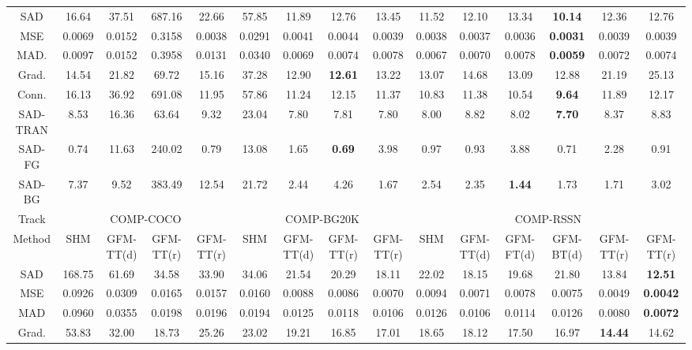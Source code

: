 \documentclass[twocolumn]{svjour3}
\begin{document}
\begin{table*}[htbp]
{\begin{tabular}{c|ccccc|ccc|ccc|ccc}
\hline
SAD & 16.64 & 37.51 & 687.16& 22.66 &57.85  &11.89&12.76&13.45 &11.52&12.10& 13.34&\textbf{10.14}&12.36&12.76\\
MSE & 0.0069 & 0.0152& 0.3158 & 0.0038 & 0.0291 &0.0041&0.0044&0.0039&0.0038&0.0037& 0.0036&\textbf{0.0031}&0.0039 & 0.0039\\
MAD. & 0.0097 & 0.0152 &0.3958 & 0.0131 &  0.0340&0.0069&0.0074 & 0.0078&0.0067&0.0070 &0.0078&\textbf{0.0059}&0.0072 & 0.0074\\
Grad. & 14.54 & 21.82 & 69.72 & 15.16 & 37.28&12.90&\textbf{12.61}&13.22 &13.07&14.68& 13.09&12.88&21.19 & 25.13\\
Conn. & 16.13 & 36.92 & 691.08 & 11.95 &  57.86&11.24&12.15&11.37 &10.83&11.38& 10.54&\textbf{9.64}&11.89 & 12.17\\
SAD-TRAN & 8.53 & 16.36 & 63.64 & 9.32 &23.04 &7.80&7.81&7.80 &8.00&8.82& 8.02&\textbf{7.70}&8.37 & 8.83\\
SAD-FG & 0.74 & 11.63  & 240.02 &0.79 & 13.08 &1.65&\textbf{0.69}&3.98&0.97&0.93& 3.88&0.71&2.28 & 0.91\\
SAD-BG & 7.37 & 9.52 & 383.49 &12.54 & 21.72 &2.44&4.26&1.67&2.54&2.35& \textbf{1.44}&1.73&1.71 & 3.02\\
\hline
Track & \multicolumn{4}{|c}{COMP-COCO} & \multicolumn{4}{|c}{COMP-BG20K} & \multicolumn{6}{|c}{COMP-RSSN}\\
\hline
Method & SHM & \multicolumn{1}{c}{GFM-TT(d)} & \multicolumn{1}{c}{GFM-TT(r)} & \multicolumn{1}{c|}{GFM-TT(r)} &\multicolumn{1}{c}{SHM} &\multicolumn{1}{c}{GFM-TT(d)} & GFM-TT(r)& \multicolumn{1}{c|}{GFM-TT(r)} &SHM & GFM-TT(d)&\multicolumn{1}{c}{GFM-FT(d)} & GFM-BT(d)& GFM-TT(r) & GFM-TT(r)\\
\hline
SAD & 168.75&61.69&34.58 & \multicolumn{1}{c|}{33.90}& \multicolumn{1}{c}{34.06}&\multicolumn{1}{c}{21.54}&20.29&\multicolumn{1}{c|}{18.11}&22.02&\multicolumn{1}{c}{18.15} &\multicolumn{1}{c}{19.68}&21.80 &13.84 & \textbf{12.51}\\
MSE &0.0926 &0.0309&0.0165 &\multicolumn{1}{c|}{0.0157}& \multicolumn{1}{c}{0.0160}&\multicolumn{1}{c}{0.0088}&0.0086&\multicolumn{1}{c|}{0.0070}&0.0094&\multicolumn{1}{c}{0.0071} &\multicolumn{1}{c}{0.0078}& 0.0075&0.0049 & \textbf{0.0042}\\
MAD & 0.0960&0.0355&0.0198&\multicolumn{1}{c|}{0.0196} &\multicolumn{1}{c}{0.0194} &\multicolumn{1}{c}{0.0125}&0.0118&\multicolumn{1}{c|}{0.0106}&0.0126&\multicolumn{1}{c}{0.0106} &\multicolumn{1}{c}{0.0114}&0.0126 &0.0080 & \textbf{0.0072}\\
Grad. & 53.83&32.00&18.73 &\multicolumn{1}{c|}{25.26}& \multicolumn{1}{c}{23.02}&\multicolumn{1}{c}{19.21}&16.85&\multicolumn{1}{c|}{17.01}&18.65&\multicolumn{1}{c}{18.12} &\multicolumn{1}{c}{17.50}&16.97 &\textbf{14.44} & 14.62\\

\end{tabular}}
\end{table*}
\end{document}
